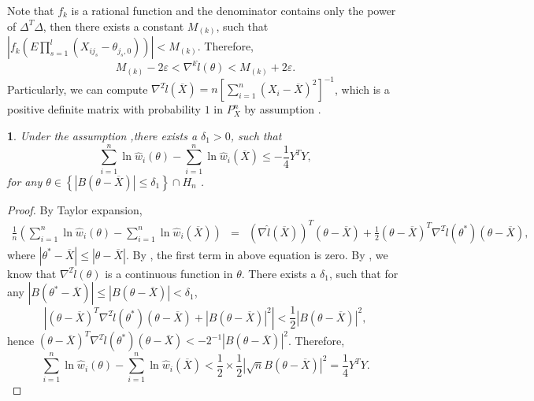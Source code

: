 \documentclass[oneside,english]{amsbook}
\numberwithin{section}{chapter}
\numberwithin{equation}{section}
\numberwithin{figure}{section}
\theoremstyle{plain}
\newtheorem{lem}{\protect\lemmaname}
\theoremstyle{plain}
\theoremstyle{definition}
\theoremstyle{plain}
\theoremstyle{plain}
\theoremstyle{remark}
\theoremstyle{definition}
\theoremstyle{definition}
\providecommand{\lemmaname}{Lemma}
\begin{document}
Note that $f_{k}$ is a rational function and the denominator contains
only the power of $\Delta^{T}\Delta$, then there exists a constant
$M_{\left(k\right)}$, such that $\left|f_{k}\left(E\prod_{s=1}^{l}\left(X_{ij_{s}}-\theta_{j_{s},0}\right)\right)\right|<M_{\left(k\right)}.$
Therefore, 
\[
M_{\left(k\right)}-2\varepsilon<\nabla^{k}\hat{l}\left(\theta\right)<M_{\left(k\right)}+2\varepsilon.
\]
Particularly, we can compute $\nabla^{2}\hat{l}\left(\overline{X}\right)=n\left[\sum_{i=1}^{n}\left(X_{i}-\overline{X}\right)^{2}\right]^{-1}$,
which is a positive definite matrix with probability $1$ in $P_{X}^{n}$
by assumption  . 
\begin{lem}
\label{lem:near-mean-2nd-order-bound}Under the assumption ,there
exists a $\delta_{1}>0$, such that 
\[
\sum_{i=1}^{n}\ln\hat{w}_{i}\left(\theta\right)-\sum_{i=1}^{n}\ln\hat{w}_{i}\left(\overline{X}\right)\le-\frac{1}{4}Y^{T}Y,
\]
for any $\theta\in\left\{ \left|B\left(\theta-\overline{X}\right)\right|\le\delta_{1}\right\} \cap H_{n}$
. \end{lem}
\begin{proof}
By Taylor expansion, 
\begin{eqnarray*}
\frac{1}{n}\left(\sum_{i=1}^{n}\ln\hat{w}_{i}\left(\theta\right)-\sum_{i=1}^{n}\ln\hat{w}_{i}\left(\overline{X}\right)\right) & = & \left(\nabla\hat{l}\left(\overline{X}\right)\right)^{T}\left(\theta-\overline{X}\right)+\frac{1}{2}\left(\theta-\overline{X}\right)^{T}\nabla^{2}\hat{l}\left(\theta^{*}\right)\left(\theta-\overline{X}\right),
\end{eqnarray*}
where $\left|\theta^{*}-\overline{X}\right|\le\left|\theta-\overline{X}\right|$.
By , the first term in above equation is zero.
By , we know that $\nabla^{2}\hat{l}\left(\theta\right)$
is a continuous function in $\theta$. There exists a $\delta_{1}$,
such that for any $\left|B\left(\theta^{*}-\overline{X}\right)\right|\le\left|B\left(\theta-\overline{X}\right)\right|<\delta_{1}$,
\[
\left|\left(\theta-\overline{X}\right)^{T}\nabla^{2}\hat{l}\left(\theta^{*}\right)\left(\theta-\overline{X}\right)+\left|B\left(\theta-\overline{X}\right)\right|^{2}\right|<\frac{1}{2}\left|B\left(\theta-\overline{X}\right)\right|^{2},
\]
hence $\left(\theta-\overline{X}\right)^{T}\nabla^{2}\hat{l}\left(\theta^{*}\right)\left(\theta-\overline{X}\right)<-2^{-1}\left|B\left(\theta-\overline{X}\right)\right|^{2}$.
Therefore, 
\[
\sum_{i=1}^{n}\ln\hat{w}_{i}\left(\theta\right)-\sum_{i=1}^{n}\ln\hat{w}_{i}\left(\overline{X}\right)<\frac{1}{2}\times\frac{1}{2}\left|\sqrt{n}B\left(\theta-\overline{X}\right)\right|^{2}=\frac{1}{4}Y^{T}Y.
\]

\end{proof}
\end{document}
